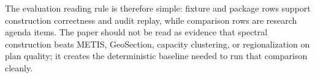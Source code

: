 The evaluation reading rule is therefore simple: fixture and package rows
support construction correctness and audit replay, while comparison rows are
research agenda items. The paper should not be read as evidence that spectral
construction beats METIS, GeoSection, capacity clustering, or regionalization
on plan quality; it creates the deterministic baseline needed to run that
comparison cleanly.
